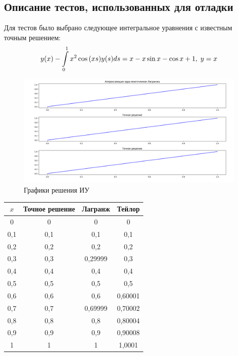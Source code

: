 \documentclass[14pt, a4paper]{extarticle}
\begin{document}
	\subsection{Описание тестов, использованных для отладки}
		Для тестов было выбрано следующее интегральное уравнения с известным точным решением:
		\[ y(x) - \int\displaylimits_{0}^{1} x^2 \cos{(xs)} y(s)ds = x - x\sin{x} - \cos{x} + 1, \; y = x \]
		\begin{figure}[h]
			\centering
			\includegraphics[width = \linewidth]{plot_1.png}
			\caption{Графики решения ИУ}
		\end{figure}
		\begin{center}
			\begin{tabular}{ |c|c|c|c| }
				\hline
				$x$ & Точное решение & Лагранж & Тейлор\\
				\hline
				0 & 0 & 0 & 0\\
				\hline
				0,1 & 0,1 & 0,1 & 0,1\\
				\hline
				0,2 & 0,2 & 0,2 & 0,2\\
				\hline
				0,3 & 0,3 & 0,29999 & 0,3\\
				\hline
				0,4 & 0,4 & 0,4 & 0,4\\
				\hline
				0,5 & 0,5 & 0,5 & 0,5\\
				\hline
				0,6 & 0,6 & 0,6 & 0,60001\\
				\hline
				0,7 & 0,7 & 0,69999 & 0,70002\\
				\hline
				0,8 & 0,8 & 0,8 & 0,80004\\
				\hline
				0,9 & 0,9 & 0,9 & 0,90008\\
				\hline
				1 & 1 & 1 & 1,0001\\
				\hline
			\end{tabular}
		\end{center}
	\pagebreak
\end{document}
